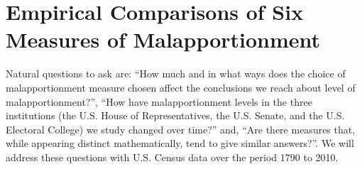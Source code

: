 
\section{Empirical Comparisons of Six Measures of Malapportionment} \label{sec:empirical}
%
Natural questions to ask are: ``How much and in what ways does the choice of malapportionment measure chosen affect the conclusions we reach about level of malapportionment?'', ``How have malapportionment levels in the three institutions (the U.S. House of Representatives, the U.S. Senate, and the U.S. Electoral College) we study changed over time?'' and, ``Are there measures that, while appearing distinct mathematically, tend to give similar answers?''. We will address these questions with U.S. Census data over the period 1790 to 2010. 

